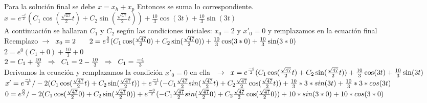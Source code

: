 \documentclass[12pt,a4paper]{article}
\begin{document}
Para la solución final se debe $x=x_{h}+x_{p}$ Entonces se suma lo correspondiente.\\ 

$x=e^{\frac{-t}{2} }(C_{1}\cos(\frac{\sqrt{47}}{2} t)+C_{2}\sin(\frac{\sqrt{47}}{2} t))+\frac{10}{3}\cos(3t)+\frac{10}{3}\sin(3t)$\\

A continuación se hallaran $C_{1}$ y $C_{2}$ según las condiciones iniciales: $x_{0}=2$  y $x'_{0}=0$ y remplazamos en la ecuación final \\

Reemplazo$\hspace{0.2cm}\rightarrow\hspace{0.2cm}x_{0}=2$ $\hspace{0.5cm}2=e^{\frac{0}{2} }(C_{1}\cos(\frac{\sqrt{47}}{2} 0)+C_{2}\sin(\frac{\sqrt{47}}{2} 0))+\frac{10}{3}\cos(3*0)+\frac{10}{3}\sin(3*0)$\\

$2=e^{0 }(C_{1}+0)+\frac{10}{3}+0$\\

$2=C_{1}+\frac{10}{3}\hspace{0.2cm}\Rightarrow\hspace{0.2cm}C_{1}=2-\frac{10}{3}\hspace{0.2cm}\Rightarrow\hspace{0.2cm}C_{1}=\frac{-4}{3} $\\

Derivamos la ecuación y remplazamos la condición $x'_{0}=0$ en ella $\hspace{0.2cm}\rightarrow\hspace{0.2cm} x=e^{\frac{-t}{2} }(C_{1}\cos(\frac{\sqrt{47}}{2} t)+C_{2}\sin(\frac{\sqrt{47}}{2} t))+\frac{10}{3}\cos(3t)+\frac{10}{3}\sin(3t)$\\

$x'=e^{\frac{-t}{2} }/-2(C_{1}\cos(\frac{\sqrt{47}}{2} t)+C_{2}\sin(\frac{\sqrt{47}}{2} t))+e^{\frac{-t}{2} }(-C_{1}\-\frac{\sqrt{47}}{2}sin(\frac{\sqrt{47}}{2}t)+C_{2}\frac{\sqrt{47}}{2}\cos(\frac{\sqrt{47}}{2} t))
+\frac{10}{3}*3*sin(3t)+\frac{10}{3}*3*cos(3t)$\\


$0=e^{\frac{0}{2} }/-2(C_{1}\cos(\frac{\sqrt{47}}{2} 0)+C_{2}\sin(\frac{\sqrt{47}}{2} 0))+e^{\frac{-0}{2} }(-C_{1}\-\frac{\sqrt{47}}{2}sin(\frac{\sqrt{47}}{2}0)+C_{2}\frac{\sqrt{47}}{2}\cos(\frac{\sqrt{47}}{2} 0))+10*sin(3*0)+10*cos(3*0)$\\%
\end{document}
